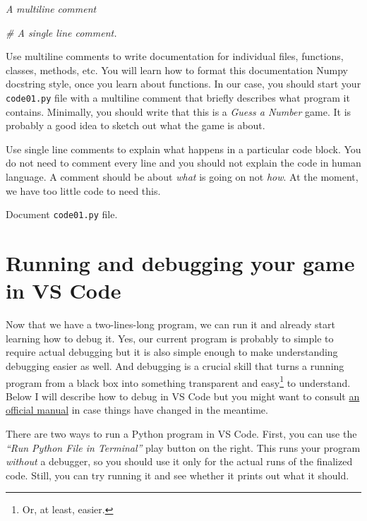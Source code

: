 \documentclass[
]{book}
\newenvironment{Shaded}{\begin{snugshade}}{\end{snugshade}}
\newcommand{\CommentTok}[1]{\textcolor[rgb]{0.56,0.35,0.01}{\textit{#1}}}
\begin{document}
\begin{Shaded}
\begin{Highlighting}[]
\CommentTok{\textquotesingle{}\textquotesingle{}\textquotesingle{}}
\CommentTok{A }
\CommentTok{multiline }
\CommentTok{comment}
\CommentTok{\textquotesingle{}\textquotesingle{}\textquotesingle{}}

\CommentTok{\#  A single line comment.}
\end{Highlighting}
\end{Shaded}

Use multiline comments to write documentation for individual files, functions, classes, methods, etc. You will learn how to format this documentation Numpy docstring style, once you learn about functions. In our case, you should start your \texttt{code01.py} file with a multiline comment that briefly describes what program it contains. Minimally, you should write that this is a \emph{Guess a Number} game. It is probably a good idea to sketch out what the game is about.

Use single line comments to explain what happens in a particular code block. You do not need to comment every line and you should not explain the code in human language. A comment should be about \emph{what} is going on not \emph{how}. At the moment, we have too little code to need this.

Document \texttt{code01.py} file.

\hypertarget{debugging}{%
\section{Running and debugging your game in VS Code}\label{debugging}}

Now that we have a two-lines-long program, we can run it and already start learning how to debug it. Yes, our current program is probably to simple to require actual debugging but it is also simple enough to make understanding debugging easier as well. And debugging is a crucial skill that turns a running program from a black box into something transparent and easy\footnote{Or, at least, easier.} to understand. Below I will describe how to debug in VS Code but you might want to consult \href{https://code.visualstudio.com/docs/python/debugging}{an official manual} in case things have changed in the meantime.

There are two ways to run a Python program in VS Code. First, you can use the \emph{``Run Python File in Terminal''} play button on the right. This runs your program \emph{without} a debugger, so you should use it only for the actual runs of the finalized code. Still, you can try running it and see whether it prints out what it should.
\end{document}
